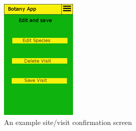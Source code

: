         \begin{figure}
            \centering
            \includegraphics[scale=1]{uiDesign/botanyAppEditSaveSiteVisit.png}
            \caption{An example site/visit confirmation screen}
            \label{fig:editSaveSite}
        \end{figure}

